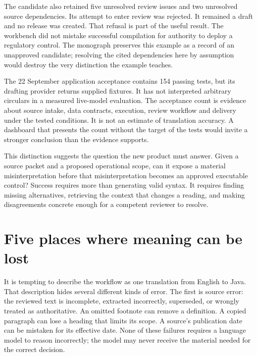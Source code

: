 \documentclass[12pt,a4paper,oneside,openany]{book}
\begin{document}
The candidate also retained five unresolved review issues and two unresolved
source dependencies. Its attempt to enter review was rejected. It remained a
draft and no release was created. That refusal is part of the useful result.
The workbench did not mistake successful compilation for authority to deploy a
regulatory control. The monograph preserves this example as a record of an
unapproved candidate; resolving the cited dependencies here by assumption would
destroy the very distinction the example teaches.

The 22 September application acceptance contains 154 passing tests, but its drafting
provider returns supplied fixtures. It has not interpreted arbitrary circulars
in a measured live-model evaluation. The acceptance count is evidence about
source intake, data contracts, execution, review workflow and delivery under the
tested conditions. It is not an estimate of translation accuracy. A dashboard
that presents the count without the target of the tests would invite a stronger
conclusion than the evidence supports.

This distinction suggests the question the new product must answer. Given a
source packet and a proposed operational scope, can it expose a material
misinterpretation before that misinterpretation becomes an approved executable
control? Success requires more than generating valid syntax. It requires finding
missing alternatives, retrieving the context that changes a reading, and making
disagreements concrete enough for a competent reviewer to resolve.

\section{Five places where meaning can be lost}
\label{merge:M01:02}

\label{sec:problem-boundaries}
It is tempting to describe the workflow as one translation from English to
Java. That description hides several different kinds of error. The first is
source error: the reviewed text is incomplete, extracted incorrectly, superseded,
or wrongly treated as authoritative. An omitted footnote can remove a definition.
A copied paragraph can lose a heading that limits its scope. A source's
publication date can be mistaken for its effective date. None of these failures
requires a language model to reason incorrectly; the model may never receive
the material needed for the correct decision.
\end{document}

